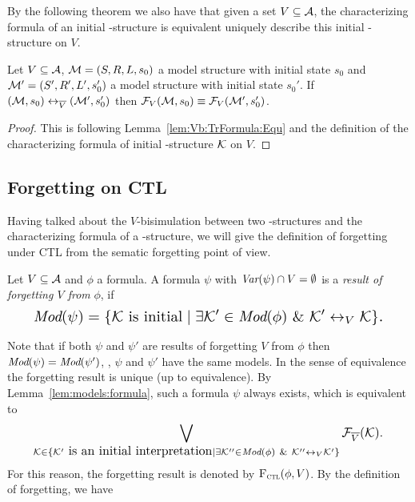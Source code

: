 \documentclass{article}
\begin{document}
By the following theorem we also have that given a set $V\subseteq {\cal A}$, the characterizing formula of an initial \MPK-structure is equivalent uniquely describe this initial \MPK-structure on $V$.
\begin{theorem}\label{thm:VBChFEQ}
Let $V\subseteq {\cal A}$, ${\cal M}=(S,R,L,s_0)$ a model structure with initial state $s_0$
and ${\cal M}'=(S',R', L',s_0')$ a model structure with initial state $s_0'$.
If $({\cal M},s_0) \leftrightarrow_{\overline V} ({\cal M}',s_0')$ then ${\cal F}_V({\cal M}, s_0) \equiv {\cal F}_V({\cal M}', s_0')$.
\end{theorem}
\begin{proof}
This is following Lemma~\ref{lem:Vb:TrFormula:Equ} and the definition of the characterizing formula of initial \MPK-structure ${\cal K}$ on $V$.
\end{proof}


\subsection{Forgetting on CTL}
Having talked about the $V$-bisimulation between two \MPK-structures and the characterizing formula of a \MPK-structure, we will give the definition of forgetting under CTL from the sematic forgetting point of view.
\begin{definition}[Forgetting]\label{def:V:forgetting}
  Let $V\subseteq\cal A$ and $\phi$ a formula.
A formula $\psi$ with $\textit{Var}(\psi)\cap V=\emptyset$
is a {\em result of forgetting $V$ from} $\phi$, if
\begin{equation}
\resizebox{.91\linewidth}{!}{$
\displaystyle
  \Mod(\psi)=\{{\cal K}\mbox{ is initial}\mid \exists {\cal K}'\in\Mod(\phi)\ \&\ {\cal K}'\lrto_V{\cal K}\}.
  $}
\end{equation}
\end{definition}
Note that if both $\psi$ and $\psi'$ are results of forgetting $V$ from $\phi$ then
$\textit{Mod}(\psi)=\textit{Mod}(\psi')$, \ie, $\psi$ and $\psi'$ have the same models. In the sense
of equivalence the forgetting result is unique (up to equivalence).
By Lemma~\ref{lem:models:formula}, such a formula $\psi$ always exists, which
is equivalent to
\begin{equation*}
\resizebox{.91\linewidth}{!}{$
\displaystyle
  \bigvee_{{\cal K}\in  \{{\cal K}'\mbox{ is an initial interpretation}\mid \exists {\cal K}''\in\Mod(\phi)\ \&\ {\cal K}''\lrto_V{\cal K}'\}} {\cal F}_{\overline V}({\cal K}).
  $}
\end{equation*}
For this reason, the forgetting result is denoted by ${\textsc{F}_{\textsc{ctl}}}(\phi,V)$. By the definition of forgetting, we have
\end{document}
